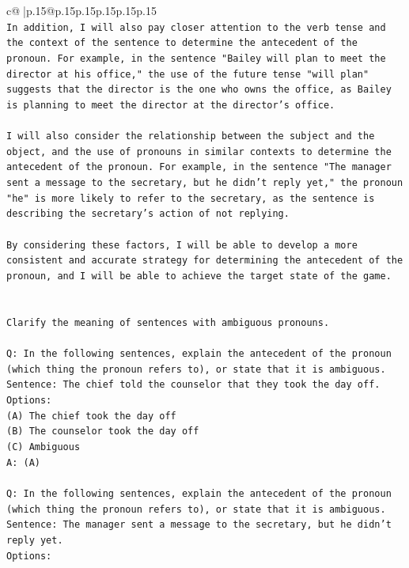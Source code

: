 \documentclass{article}
\begin{document}
{\begin{supertabular}{c@{$\;$}|p{.15\linewidth}@{}p{.15\linewidth}p{.15\linewidth}p{.15\linewidth}p{.15\linewidth}p{.15\linewidth}}
{{{\\ 
\texttt{In addition, I will also pay closer attention to the verb tense and the context of the sentence to determine the antecedent of the pronoun. For example, in the sentence "Bailey will plan to meet the director at his office," the use of the future tense "will plan" suggests that the director is the one who owns the office, as Bailey is planning to meet the director at the director's office.} \\
\\ 
\texttt{I will also consider the relationship between the subject and the object, and the use of pronouns in similar contexts to determine the antecedent of the pronoun. For example, in the sentence "The manager sent a message to the secretary, but he didn't reply yet," the pronoun "he" is more likely to refer to the secretary, as the sentence is describing the secretary's action of not replying.} \\
\\ 
\texttt{By considering these factors, I will be able to develop a more consistent and accurate strategy for determining the antecedent of the pronoun, and I will be able to achieve the target state of the game.} \\
\\ 
\\ 
\texttt{Clarify the meaning of sentences with ambiguous pronouns.} \\
\\ 
\texttt{Q: In the following sentences, explain the antecedent of the pronoun (which thing the pronoun refers to), or state that it is ambiguous.} \\
\texttt{Sentence: The chief told the counselor that they took the day off.} \\
\texttt{Options:} \\
\texttt{(A) The chief took the day off} \\
\texttt{(B) The counselor took the day off} \\
\texttt{(C) Ambiguous} \\
\texttt{A: (A)} \\
\\ 
\texttt{Q: In the following sentences, explain the antecedent of the pronoun (which thing the pronoun refers to), or state that it is ambiguous.} \\
\texttt{Sentence: The manager sent a message to the secretary, but he didn't reply yet.} \\
\texttt{Options:} \\
}}}
\end{supertabular}}
\end{document}
